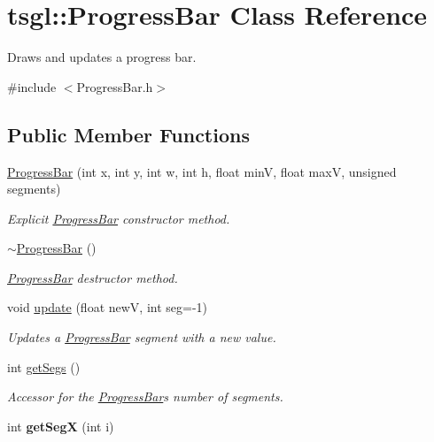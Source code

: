 \hypertarget{classtsgl_1_1_progress_bar}{}\section{tsgl\+:\+:Progress\+Bar Class Reference}
\label{classtsgl_1_1_progress_bar}


Draws and updates a progress bar.  




{\ttfamily \#include $<$Progress\+Bar.\+h$>$}

\subsection*{Public Member Functions}
\begin{DoxyCompactItemize}
\item 
\hyperlink{classtsgl_1_1_progress_bar_aee54b95dea3f338d0d54463fc9a36ee7}{Progress\+Bar} (int x, int y, int w, int h, float min\+V, float max\+V, unsigned segments)
\begin{DoxyCompactList}\small\item\em Explicit \hyperlink{classtsgl_1_1_progress_bar}{Progress\+Bar} constructor method. \end{DoxyCompactList}\item 
\hyperlink{classtsgl_1_1_progress_bar_aa3ad600db2cbd0e8f9221c264535df21}{$\sim$\+Progress\+Bar} ()
\begin{DoxyCompactList}\small\item\em \hyperlink{classtsgl_1_1_progress_bar}{Progress\+Bar} destructor method. \end{DoxyCompactList}\item 
void \hyperlink{classtsgl_1_1_progress_bar_a0c3a967ebc71dabfe21b99c3de23eee7}{update} (float new\+V, int seg=-\/1)
\begin{DoxyCompactList}\small\item\em Updates a \hyperlink{classtsgl_1_1_progress_bar}{Progress\+Bar} segment with a new value. \end{DoxyCompactList}\item 
int \hyperlink{classtsgl_1_1_progress_bar_a25576903783f18f8d74570aed2f80d95}{get\+Segs} ()
\begin{DoxyCompactList}\small\item\em Accessor for the \hyperlink{classtsgl_1_1_progress_bar}{Progress\+Bar}\textquotesingle{}s number of segments. \end{DoxyCompactList}\item 
\hypertarget{classtsgl_1_1_progress_bar_a7ecdc35e44496db7cf2e25b2ee6577d4}{}int {\bfseries get\+Seg\+X} (int i)\label{classtsgl_1_1_progress_bar_a7ecdc35e44496db7cf2e25b2ee6577d4}


\end{DoxyCompactItemize}
